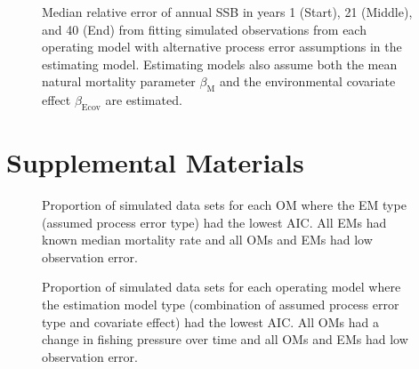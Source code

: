 \documentclass[
  12pt,
]{article}
\begin{document}
\begin{landscape}
\begin{figure}
\caption{Median relative error of annual SSB in years 1 (Start), 21 (Middle), and 40 (End) from fitting simulated observations from each operating model with alternative process error assumptions in the estimating model. Estimating models also assume both the mean natural mortality parameter $\beta_\text{M}$ and the environmental covariate effect $\beta_\text{Ecov}$ are estimated.}\label{SSB_bias_M_estimated_beta_estimated}
\begin{center}
\end{center}
\end{figure}
\end{landscape}

\hypertarget{supplemental-materials}{%
\section*{Supplemental Materials}\label{supplemental-materials}}

\setcounter{figure}{0}
\renewcommand\thefigure{S\arabic{figure}}

\begin{landscape}
\begin{figure}
\begin{center}
\end{center}
\caption{Proportion of simulated data sets for each OM where the EM type (assumed process error type) had the lowest AIC. All EMs had known median mortality rate and all OMs and EMs had low observation error.}\label{aic_supp1}
\end{figure}
\end{landscape}

\begin{landscape}
\begin{figure}
\begin{center}
\end{center}
\caption{Proportion of simulated data sets for each operating model where the estimation model type (combination of assumed process error type and covariate effect) had the lowest AIC. All OMs had a change in fishing pressure over time and all OMs and EMs had low observation error.}\label{aic_supp2}
\end{figure}
\end{landscape}
\end{document}
